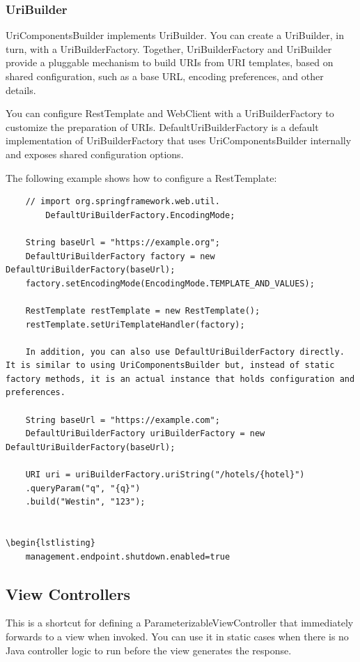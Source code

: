 \documentclass{scrartcl}
\begin{document}
\subsubsection{UriBuilder}

UriComponentsBuilder implements UriBuilder. You can create a UriBuilder, in turn, with a UriBuilderFactory. Together, UriBuilderFactory and UriBuilder provide a pluggable mechanism to build URIs from URI templates, based on shared configuration, such as a base URL, encoding preferences, and other details.

You can configure RestTemplate and WebClient with a UriBuilderFactory to customize the preparation of URIs. DefaultUriBuilderFactory is a default implementation of UriBuilderFactory that uses UriComponentsBuilder internally and exposes shared configuration options.

The following example shows how to configure a RestTemplate:
\begin{lstlisting}
    // import org.springframework.web.util.
        DefaultUriBuilderFactory.EncodingMode;

    String baseUrl = "https://example.org";
    DefaultUriBuilderFactory factory = new DefaultUriBuilderFactory(baseUrl);
    factory.setEncodingMode(EncodingMode.TEMPLATE_AND_VALUES);

    RestTemplate restTemplate = new RestTemplate();
    restTemplate.setUriTemplateHandler(factory);

    In addition, you can also use DefaultUriBuilderFactory directly. It is similar to using UriComponentsBuilder but, instead of static factory methods, it is an actual instance that holds configuration and preferences.

    String baseUrl = "https://example.com";
    DefaultUriBuilderFactory uriBuilderFactory = new DefaultUriBuilderFactory(baseUrl);

    URI uri = uriBuilderFactory.uriString("/hotels/{hotel}")
    .queryParam("q", "{q}")
    .build("Westin", "123");


\begin{lstlisting}
    management.endpoint.shutdown.enabled=true
\end{lstlisting}

\subsection{View Controllers}

This is a shortcut for defining a ParameterizableViewController that immediately forwards to a view when invoked. You can use it in static cases when there is no Java controller logic to run before the view generates the response.
\end{document}
